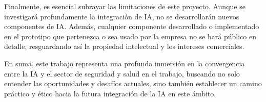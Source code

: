 Finalmente, es esencial subrayar las limitaciones de este proyecto. Aunque se investigará profundamente la integración de IA, no se desarrollarán nuevos componentes de IA. Además, cualquier componente desarrollado o implementado en el prototipo que pertenezca o sea usado por la empresa no se hará público en detalle, resguardando así la propiedad intelectual y los intereses comerciales.

En suma, este trabajo representa una profunda inmersión en la convergencia entre la IA y el sector de seguridad y salud en el trabajo, buscando no solo entender las oportunidades y desafíos actuales, sino también establecer un camino práctico y ético hacia la futura integración de la IA en este ámbito.
